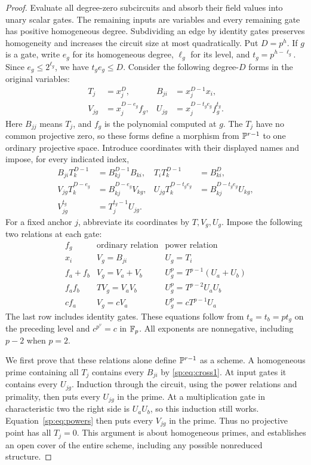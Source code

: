 \begin{proof}
Evaluate all degree-zero subcircuits and absorb their field values into
unary scalar gates. The remaining inputs are variables and every
remaining gate has positive homogeneous degree.
Subdividing an edge by identity gates preserves homogeneity and increases
the circuit size at most quadratically. Put $D=p^h$. If $g$ is a gate,
write $e_g$ for its homogeneous degree, $\ell_g$ for its level, and
$t_g=p^{h-\ell_g}$. Since $e_g\leq2^{\ell_g}$, we have $t_ge_g\leq D$.
Consider the following degree-$D$ forms in the original variables:
\begin{align*}
 T_j&=x_j^D,&B_{ji}&=x_j^{D-1}x_i,\\
 V_{jg}&=x_j^{D-e_g}f_g,&
 U_{jg}&=x_j^{D-t_ge_g}f_g^{t_g}.
\end{align*}
Here $B_{jj}$ means $T_j$, and $f_g$ is the polynomial computed at $g$.
The $T_j$ have no common projective zero, so these forms define a morphism
from $\mathbb P^{r-1}$ to one ordinary projective space. Introduce coordinates
with their displayed names and impose, for every indicated index,
\begin{align}
 B_{ji}T_k^{D-1}&=B_{kj}^{D-1}B_{ki},&
 T_iT_k^{D-1}&=B_{ki}^{D},\label{sp:eq:cross1}\\
 V_{jg}T_k^{D-e_g}&=B_{kj}^{D-e_g}V_{kg},&
 U_{jg}T_k^{D-t_ge_g}&=B_{kj}^{D-t_ge_g}U_{kg},\label{sp:eq:cross2}\\
 V_{jg}^{t_g}&=T_j^{t_g-1}U_{jg}.&&\label{sp:eq:powers}
\end{align}
For a fixed anchor $j$, abbreviate its coordinates by $T,V_g,U_g$.
Impose the following two relations at each gate:
\[
\begin{array}{c|c|c}
f_g&\text{ordinary relation}&\text{power relation}\\ \hline
x_i&V_g=B_{ji}&U_g=T_i\\
f_a+f_b&V_g=V_a+V_b&U_g^p=T^{p-1}(U_a+U_b)\\
f_af_b&TV_g=V_aV_b&U_g^p=T^{p-2}U_aU_b\\
c f_a&V_g=cV_a&U_g^p=cT^{p-1}U_a
\end{array}
\]
The last row includes identity gates. These equations follow from
$t_a=t_b=pt_g$ on the preceding level and $c^{p^v}=c$ in $\mathbb F_p$.
All exponents are nonnegative, including $p-2$ when $p=2$.

We first prove that these relations alone define $\mathbb P^{r-1}$ as a scheme.
A homogeneous prime containing all $T_j$ contains every $B_{ji}$ by
\eqref{sp:eq:cross1}. At input gates it contains every $U_{jg}$.
Induction through the circuit, using the power relations and primality,
then puts every $U_{jg}$ in the prime. At a multiplication gate in
characteristic two the right side is $U_aU_b$, so this induction still
works. Equation~\eqref{sp:eq:powers} then puts every $V_{jg}$ in the prime.
Thus no projective point has all $T_j=0$. This argument is about
homogeneous primes, and establishes an open cover of the entire scheme,
including any possible nonreduced structure.


\end{proof}
